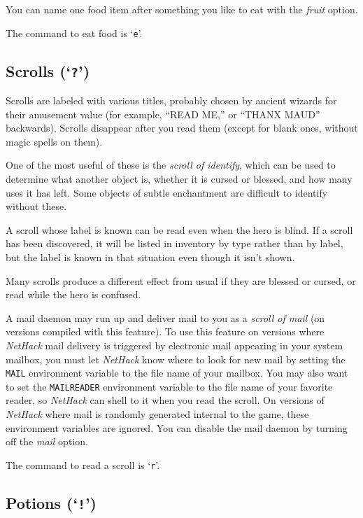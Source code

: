 \documentclass[titlepage]{article}
\begin{document}
You can name one food item after something you like to eat with the
\textit{fruit} option.

The command to eat food is `\texttt{e}'.

\subsection*{Scrolls (`\texttt{?}')}

Scrolls are labeled with various titles, probably chosen by ancient wizards
for their amusement value (for example, ``READ ME,'' or ``THANX MAUD'' backwards).
Scrolls disappear after you read them (except for blank ones, without
magic spells on them).

One of the most useful of these is the %
\textit{scroll of identify}, which
can be used to determine what another object is, whether it is cursed or
blessed, and how many uses it has left.
Some objects of subtle enchantment are difficult to identify without these.

A scroll whose label is known can be read even when the hero is blind.
If a scroll has been discovered, it will be listed in inventory by type
rather than by label, but the label is known in that situation even though
it isn't shown.

Many scrolls produce a different effect from usual if they are blessed or
cursed, or read while the hero is confused.

A mail daemon may run up and deliver mail to you as a %
\textit{scroll of mail} (on versions compiled with this feature).
To use this feature on versions where \textit{NetHack}
mail delivery is triggered by electronic mail appearing in your system mailbox,
you must let \textit{NetHack} know where to look for new mail by setting the
\texttt{MAIL} environment variable to the file name of your mailbox.
You may also want to set the \texttt{MAILREADER} environment variable to the
file name of your favorite reader, so \textit{NetHack} can shell to it when you
read the scroll.
On versions of \textit{NetHack} where mail is randomly
generated internal to the game, these environment variables are ignored.
You can disable the mail daemon by turning off the
\textit{mail} option.

The command to read a scroll is `\texttt{r}'.

\subsection*{Potions (`\texttt{!}')}
\end{document}
